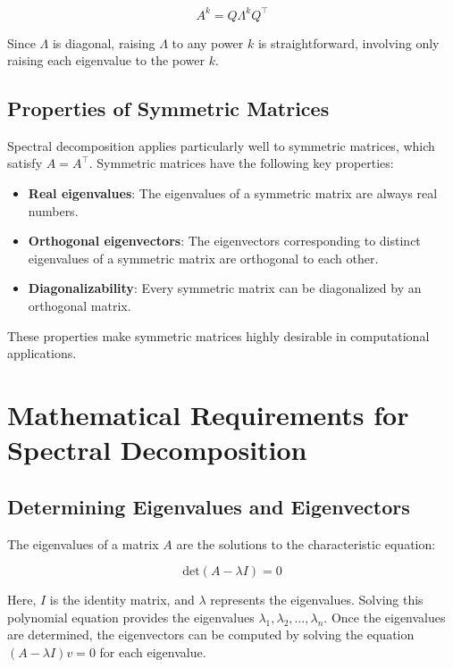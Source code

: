 \documentclass[
  letterpaper,
  DIV=11,
  numbers=noendperiod]{scrreprt}
\theoremstyle{plain}
\theoremstyle{definition}
\theoremstyle{remark}
\begin{document}
\[
A^k = Q \Lambda^k Q^\top
\]

Since \(\Lambda\) is diagonal, raising \(\Lambda\) to any power \(k\) is
straightforward, involving only raising each eigenvalue to the power
\(k\).

\subsection{Properties of Symmetric
Matrices}\label{properties-of-symmetric-matrices}

Spectral decomposition applies particularly well to symmetric matrices,
which satisfy \(A = A^\top\). Symmetric matrices have the following key
properties:

\begin{itemize}
\item
  \textbf{Real eigenvalues}: The eigenvalues of a symmetric matrix are
  always real numbers.
\item
  \textbf{Orthogonal eigenvectors}: The eigenvectors corresponding to
  distinct eigenvalues of a symmetric matrix are orthogonal to each
  other.
\item
  \textbf{Diagonalizability}: Every symmetric matrix can be diagonalized
  by an orthogonal matrix.
\end{itemize}

These properties make symmetric matrices highly desirable in
computational applications.

\section{Mathematical Requirements for Spectral
Decomposition}\label{mathematical-requirements-for-spectral-decomposition}

\subsection{Determining Eigenvalues and
Eigenvectors}\label{determining-eigenvalues-and-eigenvectors}

The eigenvalues of a matrix \(A\) are the solutions to the
characteristic equation:

\[
\text{det}(A - \lambda I) = 0
\]

Here, \(I\) is the identity matrix, and \(\lambda\) represents the
eigenvalues. Solving this polynomial equation provides the eigenvalues
\(\lambda_1, \lambda_2, \dots, \lambda_n\). Once the eigenvalues are
determined, the eigenvectors can be computed by solving the equation
\((A - \lambda I)v = 0\) for each eigenvalue.
\end{document}
